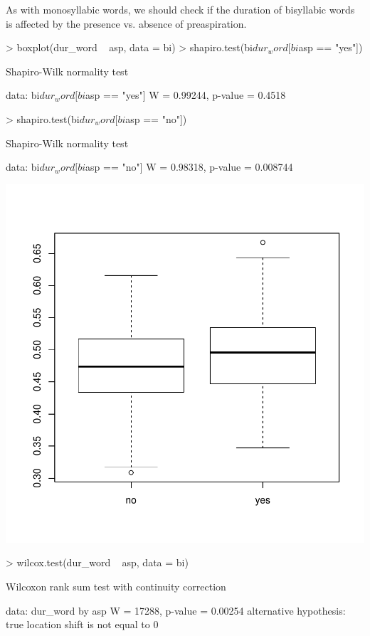 \documentclass[a4paper,11pt]{article}
\begin{document}
As with monosyllabic words, we should check if the duration of bisyllabic words is affected by the presence vs. absence of preaspiration.

\begin{Schunk}
\begin{Sinput}
> boxplot(dur_word ~ asp, data = bi)
> shapiro.test(bi$dur_word[bi$asp == "yes"])
\end{Sinput}
\begin{Soutput}
	Shapiro-Wilk normality test

data:  bi$dur_word[bi$asp == "yes"]
W = 0.99244, p-value = 0.4518
\end{Soutput}
\begin{Sinput}
> shapiro.test(bi$dur_word[bi$asp == "no"])
\end{Sinput}
\begin{Soutput}
	Shapiro-Wilk normality test

data:  bi$dur_word[bi$asp == "no"]
W = 0.98318, p-value = 0.008744
\end{Soutput}
\end{Schunk}
\includegraphics{analysis-035}

\begin{Schunk}
\begin{Sinput}
> wilcox.test(dur_word ~ asp, data = bi)
\end{Sinput}
\begin{Soutput}
	Wilcoxon rank sum test with continuity correction

data:  dur_word by asp
W = 17288, p-value = 0.00254
alternative hypothesis: true location shift is not equal to 0
\end{Soutput}
\end{Schunk}
\end{document}
